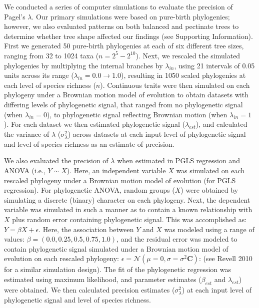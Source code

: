 \documentclass[
]{article}
\begin{document}
We conducted a series of computer simulations to evaluate the precision
of Pagel's \(\lambda\). Our primary simulations were based on pure-birth
phylogenies; however, we also evaluated patterns on both balanced and
pectinate trees to determine whether tree shape affected our findings
(see Supporting Information). First we generated 50 pure-birth
phylogenies at each of six different tree sizes, ranging from 32 to 1024
taxa (\(n=2^5 - 2^{10}\)). Next, we rescaled the simulated phylogenies
by multiplying the internal branches by \(\lambda_{in}\), using 21
intervals of 0.05 units across its range
(\(\lambda_{in} = 0.0 \to 1.0\)), resulting in 1050 scaled phylogenies
at each level of species richness (\(n\)). Continuous traits were then
simulated on each phylogeny under a Brownian motion model of evolution
to obtain datasets with differing levels of phylogenetic signal, that
ranged from no phylogenetic signal (when \(\lambda_{in} =0\)), to
phylogenetic signal reflecting Brownian motion (when
\(\lambda_{in} =1\)). For each dataset we then estimated phylogenetic
signal (\(\lambda_{est}\)), and calculated the variance of \(\lambda\)
(\(\sigma^2_\lambda\)) across datasets at each input level of
phylogenetic signal and level of species richness as an estimate of
precision. \hfill\break

We also evaluated the precision of \(\lambda\) when estimated in PGLS
regression and ANOVA (i.e., \(Y\sim{X}\)). Here, an independent variable
\(X\) was simulated on each rescaled phylogeny under a Brownian motion
model of evolution (for PGLS regression). For phylogenetic ANOVA, random
groups (\(X\)) were obtained by simulating a discrete (binary) character
on each phylogeny. Next, the dependent variable was simulated in such a
manner as to contain a known relationship with \(X\) plus random error
containing phylogenetic signal. This was accomplished as:
\(Y=\beta{X}+\epsilon\). Here, the association between \(Y\) and \(X\)
was modeled using a range of values:
\(\beta=(0.0,0.25, 0.5, 0.75,1.0)\), and the residual error was modeled
to contain phylogenetic signal simulated under a Brownian motion model
of evolution on each rescaled phylogeny:
\(\epsilon=\mathcal{N}(\mu=0,\sigma=\sigma^2\mathbf{C})\): (see Revell
2010 for a similar simulation design). The fit of the phylogenetic
regression was estimated using maximum likelihood, and parameter
estimates (\(\beta_{est}\) and \(\lambda_{est}\)) were obtained. We then
calculated precision estimates (\(\sigma^2_\lambda\)) at each input
level of phylogenetic signal and level of species richness. \hfill\break
\end{document}
